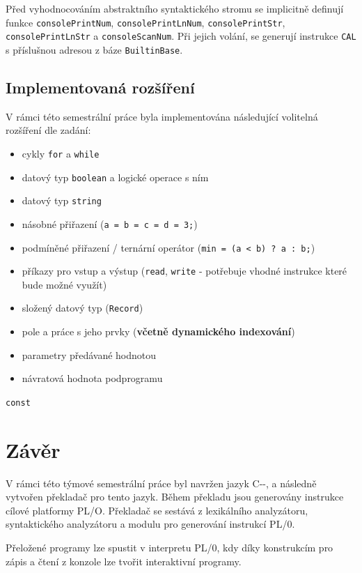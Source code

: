 \documentclass[12pt, a4paper]{article}
\let\oldsection\section
\renewcommand\section{\clearpage\oldsection}
\begin{document}
Před vyhodnocováním abstraktního syntaktického stromu se implicitně definují funkce \texttt{consolePrintNum}, \texttt{consolePrintLnNum}, \texttt{consolePrintStr}, \texttt{consolePrintLnStr} a \texttt{consoleScanNum}. Při jejich volání, se generují instrukce \texttt{CAL} s příslušnou adresou z báze \texttt{BuiltinBase}.


\subsection{Implementovaná rozšíření}
V rámci této semestrální práce byla implementována následující volitelná rozšíření dle zadání:

\begin{itemize}
    \item cykly \texttt{for} a \texttt{while}
    \item datový typ \texttt{boolean} a logické operace s ním
    \item datový typ \texttt{string} 
    \item násobné přiřazení (\texttt{a = b = c = d = 3;})
    \item podmíněné přiřazení / ternární operátor (\texttt{min = (a < b) ? a : b;})
    \item příkazy pro vstup a výstup (\texttt{read}, \texttt{write} - potřebuje vhodné instrukce které bude možné využít)
    \item složený datový typ (\texttt{Record})
    \item pole a práce s jeho prvky (\textbf{včetně dynamického indexování})
    \item parametry předávané hodnotou
    \item návratová hodnota podprogramu
\end{itemize}

\begin{huge} \texttt{const} \end{huge}

\section{Závěr}	
V rámci této týmové semestrální práce byl navržen jazyk C-{}-, a následně vytvořen překladač pro tento jazyk. Během překladu jsou generovány instrukce cílové platformy PL/O. Překladač se sestává z lexikálního analyzátoru, syntaktického analyzátoru a modulu pro generování instrukcí PL/0.

Přeložené programy lze spustit v interpretu PL/0, kdy díky konstrukcím pro zápis a čtení z konzole lze tvořit interaktivní programy.
\end{document}
